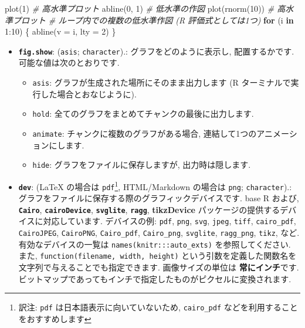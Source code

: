 \documentclass[
]{bxjsreport}
\newenvironment{Shaded}{\begin{snugshade}}{\end{snugshade}}
\newcommand{\AttributeTok}[1]{\textcolor[rgb]{0.77,0.63,0.00}{#1}}
\newcommand{\CommentTok}[1]{\textcolor[rgb]{0.56,0.35,0.01}{\textit{#1}}}
\newcommand{\ControlFlowTok}[1]{\textcolor[rgb]{0.13,0.29,0.53}{\textbf{#1}}}
\newcommand{\DecValTok}[1]{\textcolor[rgb]{0.00,0.00,0.81}{#1}}
\newcommand{\FunctionTok}[1]{\textcolor[rgb]{0.00,0.00,0.00}{#1}}
\newcommand{\NormalTok}[1]{#1}
\newcommand{\SpecialCharTok}[1]{\textcolor[rgb]{0.00,0.00,0.00}{#1}}
\providecommand{\tightlist}{%
  \setlength{\itemsep}{0pt}\setlength{\parskip}{0pt}}
\begin{document}
\begin{Shaded}
\begin{Highlighting}[numbers=left,,]
\FunctionTok{plot}\NormalTok{(}\DecValTok{1}\NormalTok{) }\CommentTok{\# 高水準プロット}
\FunctionTok{abline}\NormalTok{(}\DecValTok{0}\NormalTok{, }\DecValTok{1}\NormalTok{) }\CommentTok{\# 低水準の作図}
\FunctionTok{plot}\NormalTok{(}\FunctionTok{rnorm}\NormalTok{(}\DecValTok{10}\NormalTok{)) }\CommentTok{\# 高水準プロット}
\CommentTok{\# ループ内での複数の低水準作図 (R 評価式としては1つ)}
\ControlFlowTok{for}\NormalTok{ (i }\ControlFlowTok{in} \DecValTok{1}\SpecialCharTok{:}\DecValTok{10}\NormalTok{) \{}
  \FunctionTok{abline}\NormalTok{(}\AttributeTok{v =}\NormalTok{ i, }\AttributeTok{lty =} \DecValTok{2}\NormalTok{)}
\NormalTok{\}}
\end{Highlighting}
\end{Shaded}

\begin{itemize}
\tightlist
\item
  \textbf{\texttt{fig.show}}:
  (\texttt{\textquotesingle{}asis\textquotesingle{}};
  \texttt{character}).: グラフをどのように表示し, 配置するかです.
  可能な値は次のとおりです.

  \begin{itemize}
  \tightlist
  \item
    \texttt{asis}: グラフが生成された場所にそのまま出力します (R
    ターミナルで実行した場合とおなじように).
  \item
    \texttt{hold}: 全てのグラフをまとめてチャンクの最後に出力します.
  \item
    \texttt{animate}: チャンクに複数のグラフがある場合,
    連結して1つのアニメーションにします.
  \item
    \texttt{hide}: グラフをファイルに保存しますが, 出力時は隠します.
  \end{itemize}
\item
  \textbf{\texttt{dev}}: (LaTeX の場合は
  \texttt{\textquotesingle{}pdf\textquotesingle{}}\footnote{訳注:
    \texttt{pdf} は日本語表示に向いていないため, \texttt{cairo\_pdf}
    などを利用することをおすすめします}, HTML/Markdown の場合は
  \texttt{\textquotesingle{}png\textquotesingle{}};
  \texttt{character}).:
  グラフをファイルに保存する際のグラフィックデバイスです. base R および,
  \textbf{\texttt{Cairo}}, \textbf{\texttt{cairoDevice}},
  \textbf{\texttt{svglite}}, \textbf{\texttt{ragg}}, \textbf{tikzDevice}
  パッケージの提供するデバイスに対応しています. デバイスの例:
  \texttt{pdf}, \texttt{png}, \texttt{svg}, \texttt{jpeg},
  \texttt{tiff}, \texttt{cairo\_pdf}, \texttt{CairoJPEG},
  \texttt{CairoPNG}, \texttt{Cairo\_pdf}, \texttt{Cairo\_png},
  \texttt{svglite}, \texttt{ragg\_png}, \texttt{tikz}, など.
  有効なデバイスの一覧は \texttt{names(knitr:::auto\_exts)}
  を参照してください. また, \texttt{function(filename,\ width,\ height)}
  という引数を定義した関数名を文字列で与えることでも指定できます.
  画像サイズの単位は \textbf{常にインチ}です.
  ビットマップであってもインチで指定したものがピクセルに変換されます.
\end{itemize}
\end{document}
